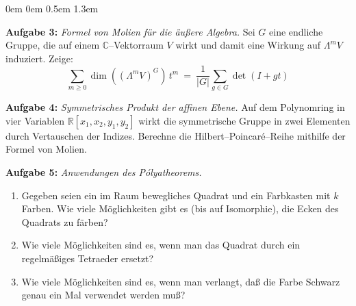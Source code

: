 \documentclass[a4paper,ngerman]{scrartcl}
\theoremstyle{definition}
\theoremstyle{plain}
\theoremstyle{remark}
\begin{document}
\begin{list}{}{0em \leftmargin0em \itemindent0.5em \itemsep 1.3em}
\item[\textbf{Aufgabe 3:}] \emph{Formel von Molien für die äußere Algebra. } Sei $G$ eine endliche Gruppe, die auf einem $\mathbb{C}$--Vektorraum $V$ wirkt und damit eine Wirkung auf $\Lambda^mV$ induziert. Zeige:
$$ \sum_{m\geq 0} \dim\left(\left(\Lambda^mV\right)^G\right)\,t^m \ = \ \frac{1}{|G|}\sum_{g\in G} \det(I+gt) $$
\item[\textbf{Aufgabe 4:}] \emph{Symmetrisches Produkt der affinen Ebene.} Auf dem Polynomring in vier Variablen $\mathbb{R}[x_1,x_2,y_1,y_2]$ wirkt die symmetrische Gruppe in zwei Elementen durch Vertauschen der Indizes. Berechne die Hilbert--Poincaré--Reihe mithilfe der Formel von Molien.
\item[\textbf{Aufgabe 5:}] \emph{Anwendungen des Pólyatheorems.} \begin{enumerate}
\item Gegeben seien ein im Raum bewegliches Quadrat und ein Farbkasten mit $k$ Farben. Wie viele Möglichkeiten gibt es (bis auf Isomorphie), die Ecken des Quadrats zu färben?
\item Wie viele Möglichkeiten sind es, wenn man das Quadrat durch ein regelmäßiges Tetraeder ersetzt?
\item Wie viele Möglichkeiten sind es, wenn man verlangt, daß die Farbe Schwarz genau ein Mal verwendet werden muß?
\end{enumerate}
\end{list}
\end{document}
